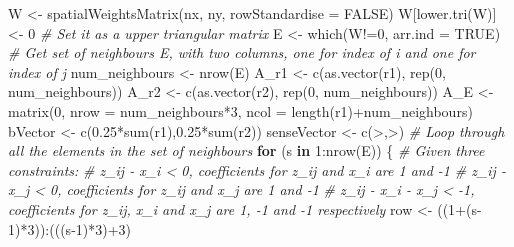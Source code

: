 \documentclass[
]{article}
\newenvironment{Shaded}{\begin{snugshade}}{\end{snugshade}}
\newcommand{\AttributeTok}[1]{\textcolor[rgb]{0.77,0.63,0.00}{#1}}
\newcommand{\CommentTok}[1]{\textcolor[rgb]{0.56,0.35,0.01}{\textit{#1}}}
\newcommand{\ConstantTok}[1]{\textcolor[rgb]{0.00,0.00,0.00}{#1}}
\newcommand{\ControlFlowTok}[1]{\textcolor[rgb]{0.13,0.29,0.53}{\textbf{#1}}}
\newcommand{\DecValTok}[1]{\textcolor[rgb]{0.00,0.00,0.81}{#1}}
\newcommand{\FloatTok}[1]{\textcolor[rgb]{0.00,0.00,0.81}{#1}}
\newcommand{\FunctionTok}[1]{\textcolor[rgb]{0.00,0.00,0.00}{#1}}
\newcommand{\NormalTok}[1]{#1}
\newcommand{\OtherTok}[1]{\textcolor[rgb]{0.56,0.35,0.01}{#1}}
\newcommand{\SpecialCharTok}[1]{\textcolor[rgb]{0.00,0.00,0.00}{#1}}
\newcommand{\StringTok}[1]{\textcolor[rgb]{0.31,0.60,0.02}{#1}}
\begin{document}
\begin{Shaded}
\begin{Highlighting}[]
\NormalTok{W }\OtherTok{\textless{}{-}} \FunctionTok{spatialWeightsMatrix}\NormalTok{(nx, ny, }\AttributeTok{rowStandardise =} \ConstantTok{FALSE}\NormalTok{)}
\NormalTok{W[}\FunctionTok{lower.tri}\NormalTok{(W)] }\OtherTok{\textless{}{-}} \DecValTok{0} \CommentTok{\# Set it as a upper triangular matrix}
\NormalTok{E }\OtherTok{\textless{}{-}} \FunctionTok{which}\NormalTok{(W}\SpecialCharTok{!=}\DecValTok{0}\NormalTok{, }\AttributeTok{arr.ind =} \ConstantTok{TRUE}\NormalTok{) }\CommentTok{\# Get set of neighbours E, with two columns, one for index of i and one for index of j}
\NormalTok{num\_neighbours }\OtherTok{\textless{}{-}} \FunctionTok{nrow}\NormalTok{(E)}
\NormalTok{A\_r1 }\OtherTok{\textless{}{-}} \FunctionTok{c}\NormalTok{(}\FunctionTok{as.vector}\NormalTok{(r1), }\FunctionTok{rep}\NormalTok{(}\DecValTok{0}\NormalTok{, num\_neighbours))}
\NormalTok{A\_r2 }\OtherTok{\textless{}{-}} \FunctionTok{c}\NormalTok{(}\FunctionTok{as.vector}\NormalTok{(r2), }\FunctionTok{rep}\NormalTok{(}\DecValTok{0}\NormalTok{, num\_neighbours))}
\NormalTok{A\_E }\OtherTok{\textless{}{-}} \FunctionTok{matrix}\NormalTok{(}\DecValTok{0}\NormalTok{, }\AttributeTok{nrow =}\NormalTok{ num\_neighbours}\SpecialCharTok{*}\DecValTok{3}\NormalTok{, }\AttributeTok{ncol =} \FunctionTok{length}\NormalTok{(r1)}\SpecialCharTok{+}\NormalTok{num\_neighbours)}
\NormalTok{bVector }\OtherTok{\textless{}{-}} \FunctionTok{c}\NormalTok{(}\FloatTok{0.25}\SpecialCharTok{*}\FunctionTok{sum}\NormalTok{(r1),}\FloatTok{0.25}\SpecialCharTok{*}\FunctionTok{sum}\NormalTok{(r2))}
\NormalTok{senseVector }\OtherTok{\textless{}{-}} \FunctionTok{c}\NormalTok{(}\StringTok{\textquotesingle{}\textgreater{}\textquotesingle{}}\NormalTok{,}\StringTok{\textquotesingle{}\textgreater{}\textquotesingle{}}\NormalTok{)}
\CommentTok{\# Loop through all the elements in the set of neighbours}
\ControlFlowTok{for}\NormalTok{ (s }\ControlFlowTok{in} \DecValTok{1}\SpecialCharTok{:}\FunctionTok{nrow}\NormalTok{(E)) \{}
  \CommentTok{\# Given three constraints:}
  \CommentTok{\# z\_ij {-} x\_i \textless{} 0, coefficients for z\_ij and x\_i are 1 and {-}1}
  \CommentTok{\# z\_ij {-} x\_j \textless{} 0, coefficients for z\_ij and x\_j are 1 and {-}1}
  \CommentTok{\# z\_ij {-} x\_i {-} x\_j \textless{} {-}1, coefficients for z\_ij, x\_i and x\_j are 1, {-}1 and {-}1 respectively}
\NormalTok{  row }\OtherTok{\textless{}{-}}\NormalTok{ ((}\DecValTok{1}\SpecialCharTok{+}\NormalTok{(s}\DecValTok{{-}1}\NormalTok{)}\SpecialCharTok{*}\DecValTok{3}\NormalTok{))}\SpecialCharTok{:}\NormalTok{(((s}\DecValTok{{-}1}\NormalTok{)}\SpecialCharTok{*}\DecValTok{3}\NormalTok{)}\SpecialCharTok{+}\DecValTok{3}\NormalTok{)}

\end{Highlighting}
\end{Shaded}
\end{document}
